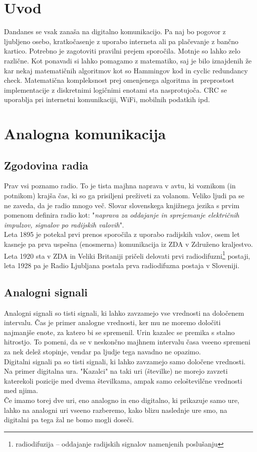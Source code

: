 \documentclass[12pt]{article}
\begin{document}
\newpage
\section{Uvod}
Dandanes se vsak zanaša na digitalno komunikacijo. Pa naj bo pogovor z ljubljeno
osebo, kratkočasenje z uporabo interneta ali pa plačevanje z bančno kartico. 
Potrebno je zagotoviti pravilni prejem sporočila. Motnje so lahko zelo različne.
Kot ponavadi si lahko pomagamo z matematiko, saj je bilo iznajdenih že kar nekaj
matematičnih algoritmov kot so Hammingov kod in cyclic redundancy check. 
Matematična kompleksnost prej omenjenega algoritma in preprostost
implementacije z diskretnimi logičnimi enotami sta nasprotujoča. CRC se
uporablja pri internetni komunikaciji, WiFi, mobilnih podatkih ipd.
\section{Analogna komunikacija}
    \subsection{Zgodovina radia}
        Prav vsi poznamo radio. To je tista majhna naprava v avtu, ki 
        voznikom (in potnikom) krajša čas, ki so ga prisiljeni preživeti za
        volanom. Veliko ljudi pa se ne zaveda, da je radio mnogo več. Slovar
        slovenskega knjižnega jezika s prvim pomenom definira radio
        kot: "\textit{naprava za oddajanje in sprejemanje električnih 
        impulzov, signalov po radijskih valovih}". \cite{SSKJ-radio}\\
        Leta 1895 \cite{ppt} je potekal prvi prenos sporočila z uporabo
        radijskih valov, osem let kasneje pa prva uspešna (enosmerna) 
        komunikacija iz ZDA v Združeno kraljestvo. Leta 1920 sta v ZDA in 
        Veliki Britaniji pričeli delovati prvi radiodifuzni\footnote{
        radiodifuzija – oddajanje radijskih signalov namenjenih poslušanju} 
        postaji, leta 1928 pa je Radio Ljubljana postala prva radiodifuzna 
        postaja v Sloveniji.
    \subsection{Analogni signali}
        Analogni signali so tisti signali, ki lahko zavzamejo vse vrednosti
        na določenem intervalu. Čas je primer analogne vrednosti, ker mu ne
        moremo določiti najmanjše enote, za katero bi se spremenil. Urin
        kazalec se premika s stalno hitrostjo. To pomeni, da se v neskončno
        majhnem intervalu časa vseeno spremeni za nek delež stopinje, vendar
        pa ljudje tega navadno ne opazimo.\\
        Digitalni signali pa so tisti signali, ki lahko zavzamejo samo 
        določene vrednosti. Na primer digitalna ura. "Kazalci" na taki uri 
        (številke) ne morejo zavzeti katerekoli pozicije med dvema 
        številkama, ampak samo celoštevilčne vrednosti med njima.\\
        Če imamo torej dve uri, eno analogno in eno digitalno, ki prikazuje
        samo ure, lahko na analogni uri vseeno razberemo, kako blizu 
        naslednje ure smo, na digitalni pa tega žal ne bomo mogli doseči.
\end{document}
